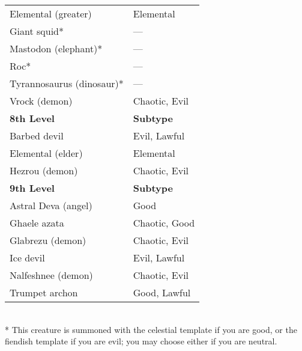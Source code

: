 \begin{xtabular}{ll}
Elemental (greater)       & Elemental        \\
Giant squid*              & ---                \\
Mastodon (elephant)*      & ---                \\
Roc*                      & ---                \\
Tyrannosaurus (dinosaur)* & ---                \\
Vrock (demon)             & Chaotic, Evil    \\
\textbf{8th Level}        & \textbf{Subtype} \\
Barbed devil              & Evil, Lawful     \\
Elemental (elder)         & Elemental        \\
Hezrou (demon)            & Chaotic, Evil    \\
\textbf{9th Level}        & \textbf{Subtype} \\
Astral Deva (angel)       & Good             \\
Ghaele azata              & Chaotic, Good    \\
Glabrezu (demon)          & Chaotic, Evil    \\
Ice devil                 & Evil, Lawful     \\
Nalfeshnee (demon)        & Chaotic, Evil    \\
Trumpet archon            & Good, Lawful     \\
\end{xtabular}\\
* This creature is summoned with the celestial template if you are good, or the fiendish template if you are evil; you may choose either if you are neutral.


